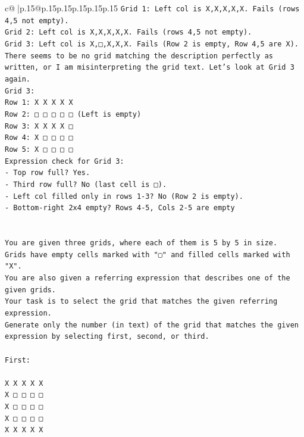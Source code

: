 \documentclass{article}
\begin{document}
{\begin{supertabular}{c@{$\;$}|p{.15\linewidth}@{}p{.15\linewidth}p{.15\linewidth}p{.15\linewidth}p{.15\linewidth}p{.15\linewidth}}
{{{\texttt{Grid 1: Left col is X,X,X,X,X. Fails (rows 4,5 not empty).} \\
\texttt{Grid 2: Left col is X,X,X,X,X. Fails (rows 4,5 not empty).} \\
\texttt{Grid 3: Left col is X,□,X,X,X. Fails (Row 2 is empty, Row 4,5 are X).} \\
\texttt{There seems to be no grid matching the description perfectly as written, or I am misinterpreting the grid text. Let's look at Grid 3 again.} \\
\texttt{Grid 3:} \\
\texttt{Row 1: X X X X X} \\
\texttt{Row 2: □ □ □ □ □ (Left is empty)} \\
\texttt{Row 3: X X X X □} \\
\texttt{Row 4: X □ □ □ □} \\
\texttt{Row 5: X □ □ □ □} \\
\texttt{Expression check for Grid 3:} \\
\texttt{{-} Top row full? Yes.} \\
\texttt{{-} Third row full? No (last cell is □).} \\
\texttt{{-} Left col filled only in rows 1{-}3? No (Row 2 is empty).} \\
\texttt{{-} Bottom{-}right 2x4 empty? Rows 4{-}5, Cols 2{-}5 are empty} \\
\\ 
\\ 
\texttt{You are given three grids, where each of them is 5 by 5 in size.} \\
\texttt{Grids have empty cells marked with "▢" and filled cells marked with "X".} \\
\texttt{You are also given a referring expression that describes one of the given grids.} \\
\texttt{Your task is to select the grid that matches the given referring expression.} \\
\texttt{Generate only the number (in text) of the grid that matches the given expression by selecting first, second, or third.} \\
\\ 
\texttt{First:} \\
\\ 
\texttt{X X X X X} \\
\texttt{X □ □ □ □} \\
\texttt{X □ □ □ □} \\
\texttt{X □ □ □ □} \\
\texttt{X X X X X} \\
}}}
\end{supertabular}}
\end{document}
